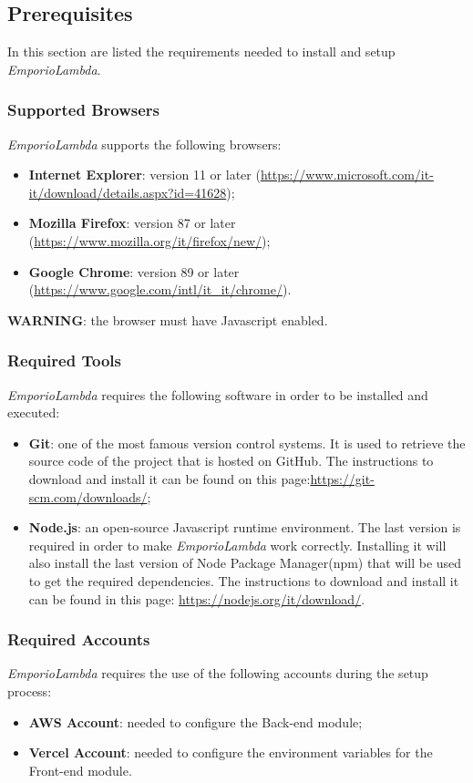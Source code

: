 \subsection{Prerequisites}
In this section are listed the requirements needed to install and setup \textit{EmporioLambda}.

\subsubsection{Supported Browsers}
\textit{EmporioLambda} supports the following browsers:
\begin{itemize}
\item \textbf{Internet Explorer}: version 11 or later (\url{https://www.microsoft.com/it-it/download/details.aspx?id=41628});
\item \textbf{Mozilla Firefox}: version 87 or later (\url{https://www.mozilla.org/it/firefox/new/});
\item \textbf{Google Chrome}: version 89 or later (\url{https://www.google.com/intl/it_it/chrome/}).
\end{itemize}
\textbf{WARNING}: the browser must have Javascript enabled.

\subsubsection{Required Tools}
\textit{EmporioLambda} requires the following software in order to be installed and executed:
\begin{itemize}
\item \textbf{Git}: one of the most famous version control systems. It is used to retrieve the source code of the project that is hosted on GitHub. The instructions to download and install it can be found on this page:\url{https://git-scm.com/downloads/};
\item \textbf{Node.js}: an open-source Javascript runtime environment. The last version is required in order to make \textit{EmporioLambda} work correctly. Installing it will also install the last version of Node Package Manager(npm) that will be used to get the required dependencies. The instructions to download and install it can be found in this page: \url{https://nodejs.org/it/download/}.
\end{itemize}

\subsubsection{Required Accounts}
\textit{EmporioLambda} requires the use of the following accounts during the setup process:
\begin{itemize}
\item \textbf{AWS Account}: needed to configure the Back-end module;
\item \textbf{Vercel Account}: needed to configure the environment variables for the Front-end module.
\end{itemize}

